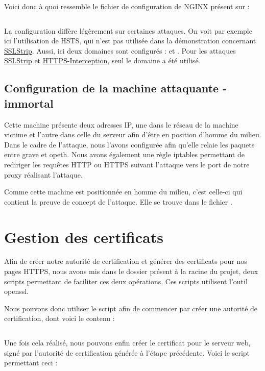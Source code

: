 Voici donc à quoi ressemble le fichier de configuration de NGINX présent sur  :

\inputminted[bgcolor=lbcolor, breaklines]{shell}{../sslstrip2/opeth/nginx.conf}

La configuration diffère légèrement sur certaines attaques. On voit par exemple ici l'utilisation de HSTS, qui n'est pas utilisée dans la démonstration concernant \hyperref[sec:sslstrip]{SSLStrip}. Aussi, ici deux domaines sont configurés :  et . Pour les attaques \hyperref[sec:sslstrip]{SSLStrip} et \hyperref[sec:https-interception]{HTTPS-Interception}, seul le domaine  a été utilisé.

\subsection{Configuration de la machine attaquante - immortal}

Cette machine présente deux adresses IP, une dans le réseau de la machine victime et l'autre dans celle du serveur afin d'être en position d'homme du milieu. Dans le cadre de l'attaque, nous l'avons configurée afin qu'elle relaie les paquets entre grave et opeth. Nous avons également une règle iptables permettant de rediriger les requêtes HTTP ou HTTPS suivant l'attaque vers le port de notre proxy réalisant l'attaque.

Comme cette machine est positionnée en homme du milieu, c'est celle-ci qui contient la preuve de concept de l'attaque. Elle se trouve dans le fichier .

\section{Gestion des certificats}

\label{sec:certificats}

Afin de créer notre autorité de certification et générer des certificats pour nos pages HTTPS, nous avons mis dans le dossier  présent à la racine du projet, deux scripts permettant de faciliter ces deux opérations. Ces scripts utilisent l'outil openssl.

Nous pouvons donc utiliser le script  afin de commencer par créer une autorité de certification, dont voici le contenu :

\inputminted[bgcolor=lbcolor, breaklines]{shell}{../CA/create-ca.sh}

Une fois cela réalisé, nous pouvons enfin créer le certificat pour le serveur web, signé par l'autorité de certification générée à l'étape précédente. Voici le script permettant ceci :

